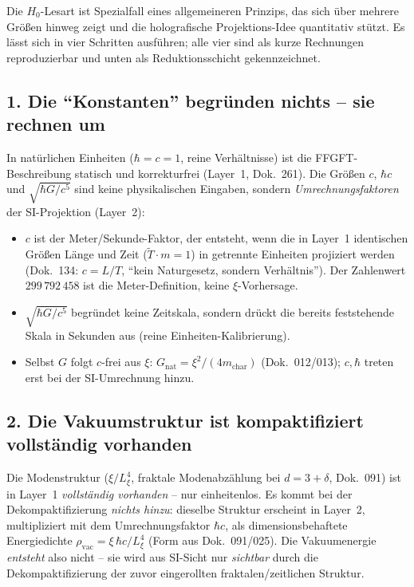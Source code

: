 Die $H_0$-Lesart ist Spezialfall eines allgemeineren Prinzips, das sich
über mehrere Größen hinweg zeigt und die holografische Projektions-Idee
quantitativ stützt. Es lässt sich in vier Schritten ausführen; alle vier
sind als kurze Rechnungen reproduzierbar und unten als Reduktionsschicht
gekennzeichnet.

\subsection*{1. Die \enquote{Konstanten} begründen nichts -- sie rechnen um}

In natürlichen Einheiten ($\hbar=c=1$, reine Verhältnisse) ist die
FFGFT-Beschreibung statisch und korrekturfrei (Layer~1, Dok.~261). Die
Größen $c$, $\hbar c$ und $\sqrt{\hbar G/c^5}$ sind keine physikalischen
Eingaben, sondern \emph{Umrechnungsfaktoren} der SI-Projektion (Layer~2):
\begin{itemize}
  \item $c$ ist der Meter/Sekunde-Faktor, der entsteht, wenn die in Layer~1
        identischen Größen Länge und Zeit ($\tilde T\cdot m=1$) in getrennte
        Einheiten projiziert werden (Dok.~134: $c=L/T$, \enquote{kein
        Naturgesetz, sondern Verhältnis}). Der Zahlenwert $299\,792\,458$
        ist die Meter-Definition, keine $\xi$-Vorhersage.
  \item $\sqrt{\hbar G/c^5}$ begründet keine Zeitskala, sondern drückt die
        bereits feststehende Skala in Sekunden aus (reine Einheiten-Kalibrierung).
  \item Selbst $G$ folgt $c$-frei aus $\xi$: $G_{\text{nat}}=\xi^2/(4m_{\text{char}})$
        (Dok.~012/013); $c,\hbar$ treten erst bei der SI-Umrechnung hinzu.
\end{itemize}

\subsection*{2. Die Vakuumstruktur ist kompaktifiziert vollständig vorhanden}

Die Modenstruktur ($\xi/L_\xi^4$, fraktale Modenabzählung bei $d=3+\delta$,
Dok.~091) ist in Layer~1 \emph{vollständig vorhanden} -- nur einheitenlos.
Es kommt bei der Dekompaktifizierung \emph{nichts hinzu}: dieselbe Struktur
erscheint in Layer~2, multipliziert mit dem Umrechnungsfaktor $\hbar c$, als
dimensionsbehaftete Energiedichte $\rho_{\text{vac}}=\xi\,\hbar c/L_\xi^4$
(Form aus Dok.~091/025). Die Vakuumenergie \emph{entsteht} also nicht --
sie wird aus SI-Sicht nur \emph{sichtbar} durch die Dekompaktifizierung der
zuvor eingerollten fraktalen/zeitlichen Struktur.

